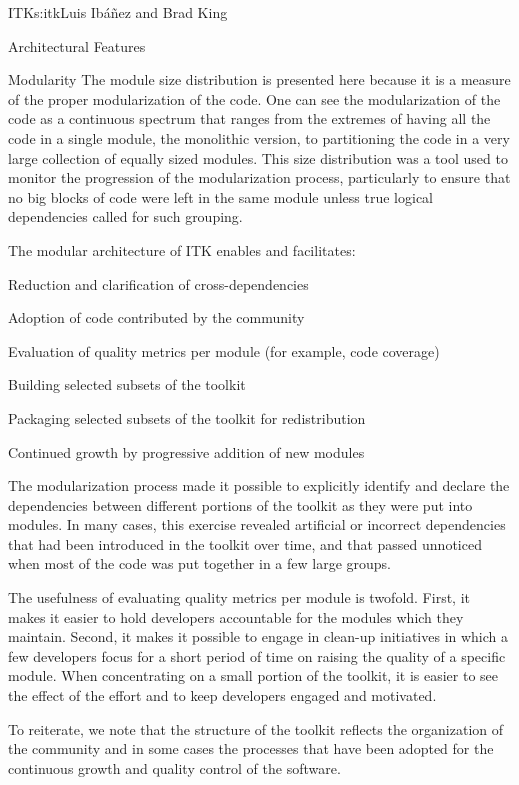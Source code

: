 \begin{aosachapter}{ITK}{s:itk}{Luis Ib\'{a}\~{n}ez and Brad King}
\begin{aosasect1}{Architectural Features}
\begin{aosasect2}{Modularity}
The module size distribution is presented here because it is a measure of the
proper modularization of the code. One can see the modularization of the code
as a continuous spectrum that ranges from the extremes of having all the code in a
single module, the monolithic version, to partitioning the code
 in a very large collection of equally sized modules. This size
distribution was a tool used to monitor the progression of the modularization
process, particularly to ensure that no big blocks of code were left in the
same module unless true logical dependencies called for such grouping.

The modular architecture of ITK enables and facilitates:

\begin{aosaitemize}
\item Reduction and clarification of cross-dependencies
\item Adoption of code contributed by the community
\item Evaluation of quality metrics per module (for example, code coverage)
\item Building selected subsets of the toolkit
\item Packaging selected subsets of the toolkit for redistribution
\item Continued growth by progressive addition of new modules
\end{aosaitemize}
\end{aosasect2}

The modularization process made it possible to explicitly identify and
declare the dependencies between different portions of the toolkit as they were
put into modules. In many cases, this exercise revealed artificial or incorrect
dependencies that had been introduced in the toolkit over time, and that passed
unnoticed when most of the code was put together in a few large groups.

The usefulness of evaluating quality metrics per module is twofold. First, 
it makes it easier to hold developers accountable for the modules which they
maintain. Second, it makes it possible to engage in
clean-up initiatives in which a few developers focus for a short period of
time on raising the quality of a specific module. When concentrating on a small
portion of the toolkit, it is easier to see the effect of the effort and to
keep developers engaged and motivated.

To reiterate, we note that the structure of the
toolkit reflects the organization of the community and in some cases the
processes that have been adopted for the continuous growth and quality control
of the software.


\end{aosasect1}
\end{aosachapter}
